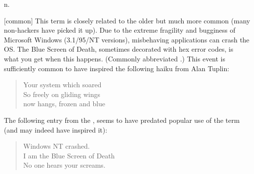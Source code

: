  n.

[common] This term is closely related to the older  but much more common (many non-hackers have picked it up). Due to the
extreme fragility and bugginess of Microsoft Windows (3.1/95/NT versions),
misbehaving applications can crash the OS. The Blue Screen of Death, sometimes
decorated with hex error codes, is what you get when this happens. (Commonly
abbreviated .) This event is sufficiently common to have
inspired the following haiku from Alan Tuplin:

\begin{verse}
    Your system which soared\\
    So freely on gliding wings\\
    now hangs, frozen and blue
\end{verse}

The following entry from the , seems to have
predated popular use of the term (and may indeed have inspired it):

\begin{verse}
    Windows NT crashed.\\
    I am the Blue Screen of Death\\
    No one hears your screams.
\end{verse}

